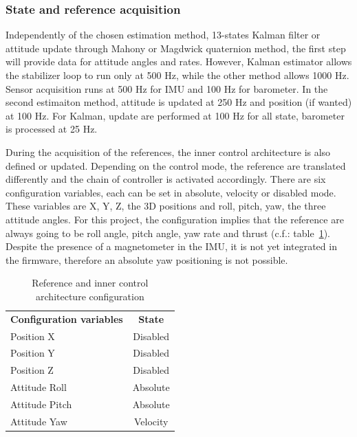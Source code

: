 \documentclass[a4paper, 12pt]{report}
\begin{document}
\subsubsection{State and reference acquisition}
Independently of the chosen estimation method, 13-states Kalman filter or attitude update through Mahony or Magdwick quaternion method, the first step will provide data for attitude angles and rates. However, Kalman estimator allows the stabilizer loop to run only at 500 Hz, while the other method allows 1000 Hz. Sensor acquisition runs at 500 Hz for IMU and 100 Hz for barometer. In the second estimaiton method, attitude is updated at 250 Hz and position (if wanted) at 100 Hz. For Kalman, update are performed at 100 Hz for all state, barometer is processed at 25 Hz.

During the acquisition of the references, the inner control architecture is also defined or updated. Depending on the control mode, the reference are translated differently and the chain of controller is activated accordingly. There are six configuration variables, each can be set in absolute, velocity or disabled mode.  These variables are X, Y, Z, the 3D positions and roll, pitch, yaw, the three attitude angles. For this project, the configuration implies that the reference are always going to be roll angle, pitch angle, yaw rate and thrust (c.f.: table~\ref{tab:setpointConfig}). Despite the presence of a magnetometer in the IMU, it is not yet integrated in the firmware, therefore an absolute yaw positioning is not possible.
\begin{table}[h]
\centering
\caption{Reference and inner control architecture configuration}
\begin{tabular}{|l|c|}
\hline
\textbf{Configuration variables} & \textbf{State}  \\
\hhline{|=|=|}
Position X & Disabled \\
\hline
Position Y & Disabled \\
\hline
Position Z & Disabled \\
\hline
Attitude Roll & Absolute\\
\hline
Attitude Pitch & Absolute\\
\hline
Attitude Yaw & Velocity\\
\hline
\end{tabular}
\label{tab:setpointConfig}
\end{table}
\end{document}
